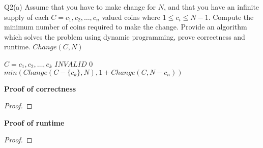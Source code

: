 \begin{problem}
  {Q2(a)}
  Assume that you have to make change for $N$, and that you have an infinite supply of each $C = c_1, c_2, \dots, c_n$ valued coins where $1 \leq c_i \leq N-1$.
  Compute the minimum number of coins required to make the change. Provide an algorithm which solves the problem using dynamic programming, prove correctness and runtime.
  $Change(C, N)$
  \begin{algorithmic}[1]
      \STATE $C = c_1, c_2, \dots, c_k$
      \RETURN $INVALID$
      \ENDIF
      \RETURN $0$
      \ENDIF
      \RETURN $min(Change(C - \{c_k\}, N), 1 + Change(C, N-c_n))$
  \end{algorithmic}
  \noindent
  \textbf{Proof of correctness}
  \begin{proof}
  \end{proof}
  \textbf{Proof of runtime}
  \begin{proof}
  \end{proof}
\end{problem}

